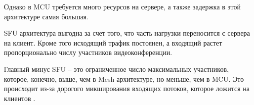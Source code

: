 Однако в MCU требуется много ресурсов на сервере, а также задержка в этой архитектуре самая большая.


SFU архитектура выгодна за счет того, что часть нагрузки переносится с сервера на клиент. Кроме того исходящий трафик постоянен, а входящий растет пропорционально числу участников видеоконференции.

Главный минус SFU -- это ограниченное число максимальных участников, которое, конечно, выше, чем в Mesh архитектуре, но меньше, чем в MCU. Это происходит из-за дорогого микширования входящих потоков, которое ложится на клиентов \cite{v20}.

\pagebreak